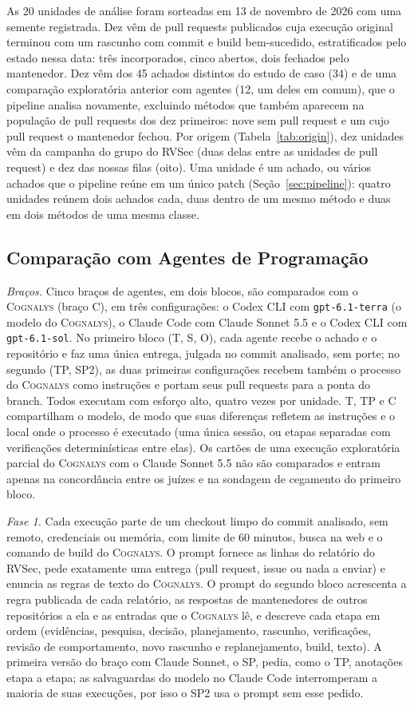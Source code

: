 \documentclass[conference]{IEEEtran}
\newcommand{\system}{\textsc{Cognalys}}
\begin{document}
As 20 unidades de análise foram sorteadas em 13 de novembro de 2026 com uma semente registrada.
Dez vêm de pull requests publicados cuja execução original terminou com um
rascunho com commit e build bem-sucedido, estratificados pelo estado nessa data: três incorporados, cinco
abertos, dois fechados pelo mantenedor. Dez vêm dos 45 achados distintos do estudo
de caso (34) e de uma comparação exploratória anterior com agentes (12, um deles
em comum), que o pipeline analisa novamente, excluindo métodos que também
aparecem na população de pull requests dos dez primeiros: nove sem
pull request e um cujo pull request o mantenedor fechou. Por origem
(Tabela~\ref{tab:origin}), dez unidades vêm da campanha do grupo do RVSec (duas
delas entre as unidades de pull request) e dez das nossas filas (oito). Uma unidade é um achado, ou
vários achados que o pipeline reúne em um único patch
(Seção~\ref{sec:pipeline}): quatro unidades reúnem dois achados cada, duas dentro
de um mesmo método e duas em dois métodos de uma mesma classe.

\subsection{Comparação com Agentes de Programação}
\label{subsec:protocol}

\emph{Braços.} Cinco braços de agentes, em dois blocos, são comparados com o {\system} (braço
C), em três configurações: o Codex CLI com \texttt{gpt-6.1-terra}
(o modelo do {\system}), o Claude Code com Claude Sonnet 5.5 e o Codex CLI
com \texttt{gpt-6.1-sol}. No primeiro bloco (T, S, O), cada agente recebe
o achado e o repositório e faz uma única entrega, julgada no commit analisado,
sem porte; no segundo (TP, SP2), as duas primeiras configurações
recebem também o processo do {\system} como instruções e portam seus pull requests
para a ponta do branch. Todos executam com esforço alto, quatro vezes por unidade. T, TP e C
compartilham o modelo, de modo que suas diferenças refletem as instruções e o local onde o
processo é executado (uma única sessão, ou etapas separadas com verificações determinísticas
entre elas). Os cartões de uma execução exploratória parcial do {\system} com o
Claude Sonnet 5.5 não são comparados e entram apenas na concordância entre os
juízes e na sondagem de cegamento do primeiro bloco.

\emph{Fase 1.} Cada execução parte de um checkout limpo do commit analisado,
sem remoto, credenciais ou memória, com limite de 60 minutos, busca na web
e o comando de build do {\system}. O prompt fornece as linhas do relatório do RVSec, pede
exatamente uma entrega (pull request, issue ou nada a enviar) e enuncia
as regras de texto do {\system}. O prompt do segundo bloco acrescenta a regra publicada
de cada relatório, as respostas de mantenedores de outros repositórios a ela e as entradas que o {\system}
lê, e descreve cada etapa em ordem (evidências, pesquisa, decisão,
planejamento, rascunho, verificações, revisão de comportamento, novo rascunho e replanejamento, build,
texto). A primeira versão do braço com Claude Sonnet, o SP, pedia, como o TP,
anotações etapa a etapa; as salvaguardas do modelo no Claude Code interromperam a
maioria de suas execuções, por isso o SP2 usa o prompt sem esse pedido.
\end{document}
